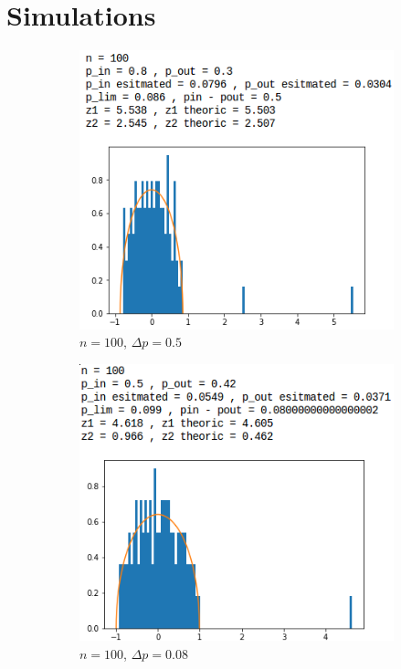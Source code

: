 \section{Simulations}
\begin{figure}[p]
	\begin{subfigure}{.5\textwidth}
		\centering
		\includegraphics[scale=0.58]{static/spectral_n100_pin08_pout03.png}
		\caption{$n=100$, $\Delta p=0.5$}
		\label{n100delta05}
	\end{subfigure}
	\begin{subfigure}{.5\textwidth}
		\centering
		\includegraphics[scale=0.58]{static/spectral_n100_pin05_pout042.png}
		\caption{$n=100$, $\Delta p=0.08$}
		\label{n100delta008}
	\end{subfigure}
	\begin{subfigure}{.5\textwidth}

\end{subfigure}
\end{figure}
